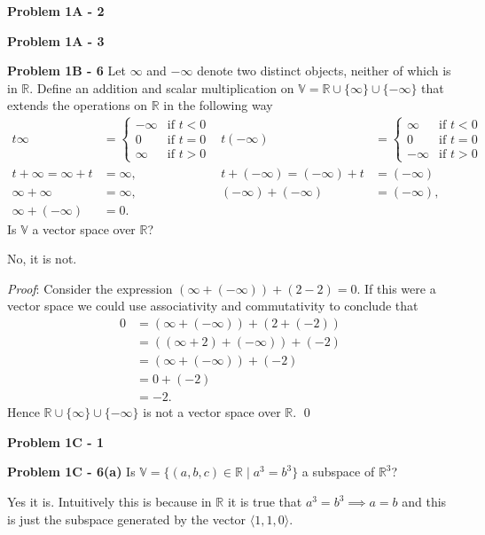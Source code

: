 \documentclass[12pt]{article}
\newcommand{\problem}[1]{\hspace{-4 ex} \large \textbf{Problem #1} }
\renewenvironment{proof}{\hspace{-4 ex} \emph{Proof}:}{\qed}
\newcommand{\RR}{\mathbb{R}}
\newcommand{\VV}{\mathbb{V}}
\begin{document}
\problem{1A - 2}

\problem{1A - 3}

\problem{1B - 6} Let $\infty$ and $-\infty$ denote two distinct objects, neither of which is in $\RR$. Define an addition and scalar multiplication on $\VV = \RR \cup \{\infty\} \cup \{-\infty\}$ that extends the operations on $\RR$ in the following way
\begin{align*}
	t\infty &= \begin{cases} -\infty & \text{if }t<0 \\
		 0 & \text{if }t=0 \\
		 \infty & \text{if }t>0 \end{cases}  & 
	t(-\infty) &= \begin{cases} \infty & \text{if }t<0 \\
	0 & \text{if }t=0 \\
	-\infty & \text{if }t>0 \end{cases} \\
	t+\infty = \infty+t &= \infty, & t+(-\infty) = (-\infty)+t &= (-\infty) \\
	\infty+\infty &= \infty, & (-\infty)+(-\infty) &= (-\infty), \\
	 \infty + (-\infty) &= 0 \text{.}
\end{align*}
Is $\VV$ a vector space over $\RR$? \bigbreak

No, it is not. \bigbreak

	\begin{proof}
		Consider the expression $(\infty + (-\infty)) + (2 - 2) = 0$. If this were a vector space we could use associativity and commutativity to conclude that 
		\begin{align*}
			0 &= (\infty + (-\infty)) + (2 + (-2)) \\
			&= ((\infty + 2) + (-\infty)) + (-2) \\
			& = (\infty + (-\infty)) + (-2) \\
			& = 0 + (-2) \\
			& = -2 \text{.}
		\end{align*}
		Hence $\RR \cup \{\infty\} \cup \{-\infty\}$ is not a vector space over $\RR$.
	\end{proof}

\problem{1C - 1}

\problem{1C - 6(a)} Is $\VV = \{(a,b,c)\in \RR \mid a^3=b^3\}$ a subspace of $\RR^3$? \bigbreak

Yes it is. Intuitively this is because in $\RR$ it is true that $a^3=b^3 \implies a=b$ and this is just the subspace generated by the vector $\langle 1, 1, 0 \rangle$.
\end{document}
